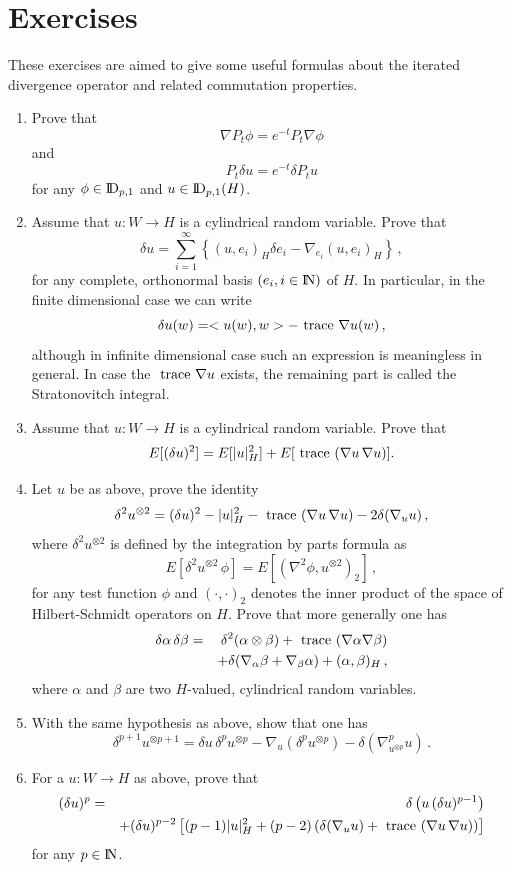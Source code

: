 \documentclass[12pt,a4paper]{book}
\newcommand{\beaa}{\begin{eqnarray*}}
\newcommand{\eeaa}{\end{eqnarray*}}
\newcommand{\NN}{{\rm I\!N}}
\newcommand{\DD}{{\rm I\!D}}
\newcommand{\trace}{{\,\,\rm trace\,\,}}
\begin{document}
\section{Exercises}{\footnotesize{
These exercises are aimed to give some useful formulas about the
iterated divergence operator and related commutation properties.
\begin{enumerate}
\item Prove that
\begin{equation}
\label{com-rel-1}
\nabla P_t\phi=e^{-t}P_t\nabla \phi
\end{equation}
and
\begin{equation}
\label{com-rel-2}
P_t\delta u=e^{-t}\delta P_tu
\end{equation}
for any $\phi\in \DD_{p,1}$ and $u\in \DD_{p,1}(H)$.
\item Assume that $u:W\to H$ is a cylindrical random variable. Prove
  that
$$
\delta u=\sum_{i=1}^\infty \left\{(u,e_i)_H\delta e_i-\nabla_{e_i}(u,e_i)_H\right\}\,,
$$
for any complete, orthonormal basis $(e_i,i\in \NN)$ of $H$. In
particular, in the finite dimensional case we can write
$$
\delta u(w)=<u(w),w>-\trace \nabla u(w)\,,
$$
although in infinite dimensional case  such an expression is meaningless in
general. In case the $\trace \nabla u$ exists, the remaining part is
called the Stratonovitch integral. 

\item Assume that $u:W\to H$ is a cylindrical random variable. Prove
  that
$$
E[(\delta u)^2]=E[|u|_H^2]+E[\trace(\nabla u\,\nabla u)].
$$
\item Let $u$ be as above, prove the identity
$$
\delta^2 u^{\otimes 2}=(\delta u)^2-|u|_H^2-\trace(\nabla u\,\nabla
u)-2\delta (\nabla_uu)\,,
$$
where $\delta^2u^{\otimes 2}$ is defined by the integration by parts
formula as
$$
E[\delta^2u^{\otimes 2}\,\phi]=E[(\nabla^2\phi,u^{\otimes 2})_2]\,,
$$
for any test function $\phi$
and  $(\cdot,\cdot)_2$ denotes the inner product of the space of
Hilbert-Schmidt operators on $H$. Prove that more generally one has
\beaa
\delta \alpha\,\delta
\beta&=&\delta^2(\alpha\otimes\beta)+\trace(\nabla\alpha
\nabla\beta)\\
&&+\delta(\nabla_\alpha\beta+\nabla_\beta\alpha)+(\alpha,\beta)_H\,,
\eeaa
where $\alpha$ and $\beta$ are two $H$-valued, cylindrical random variables.
\item With the same hypothesis as above, show that one has
$$
\delta^{p+1}u^{\otimes p+1}=\delta u\,\delta^pu^{\otimes p}-\nabla_u
(\delta^pu^{\otimes p})-\delta(\nabla^p_{u^{\otimes p}}u)\,.
$$
\item For a $u:W\to H$ as above, prove that
\beaa
(\delta u)^p&=&\delta\left(u\,(\delta u)^{p-1}\right)\\
&&+(\delta
u)^{p-2}\left[(p-1)|u|_H^2+(p-2)\left(\delta(\nabla_uu)+
\trace(\nabla u\,\nabla u)\right)\right]
\eeaa
for any $p\in \NN$.
\end{enumerate}}}
\end{document}
